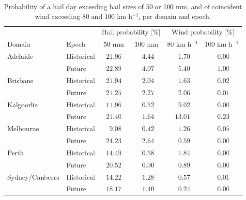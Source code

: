 \documentclass[draft,grl]{agutexSI2019}\usepackage[]{graphicx}\usepackage[]{xcolor}
\begin{document}
\begin{article}
\begin{table}
    \centering
    \caption{Probability of a hail day exceeding hail sizes of 50 or 100 mm, and of coincident wind exceeding 80 and 100 km h$^{-1}$, per domain and epoch.}
    \label{tab:exceedence_probs}
    \begin{tabular}{llcccc}
    \hline
    & & \multicolumn{2}{c}{Hail probability [\%]} & \multicolumn{2}{c}{Wind probability [\%]} \\ 
    Domain & Epoch & 50 mm & 100 mm & 80 km h$^{-1}$ & \multicolumn{1}{c}{100 km h$^{-1}$} \\ 
    \hline
Adelaide & Historical  & $21.96$ & $\phantom{0}4.44$ & $\phantom{0}1.70$ & $\phantom{0}0.00$ \\ & Future  & $22.89$ & $\phantom{0}4.07$ & $\phantom{0}5.40$ & $\phantom{0}1.00$ \\Brisbane & Historical  & $21.94$ & $\phantom{0}2.04$ & $\phantom{0}1.63$ & $\phantom{0}0.02$ \\ & Future  & $21.25$ & $\phantom{0}2.27$ & $\phantom{0}2.06$ & $\phantom{0}0.01$ \\Kalgoorlie & Historical  & $11.96$ & $\phantom{0}0.52$ & $\phantom{0}9.02$ & $\phantom{0}0.00$ \\ & Future  & $21.40$ & $\phantom{0}1.64$ & $13.01$ & $\phantom{0}0.23$ \\Melbourne & Historical  & $\phantom{0}9.08$ & $\phantom{0}0.42$ & $\phantom{0}1.26$ & $\phantom{0}0.05$ \\ & Future  & $24.23$ & $\phantom{0}2.64$ & $\phantom{0}0.59$ & $\phantom{0}0.00$ \\Perth & Historical  & $14.49$ & $\phantom{0}0.58$ & $\phantom{0}1.84$ & $\phantom{0}0.00$ \\ & Future  & $20.52$ & $\phantom{0}0.00$ & $\phantom{0}0.89$ & $\phantom{0}0.00$ \\Sydney/Canberra & Historical  & $14.22$ & $\phantom{0}1.28$ & $\phantom{0}0.57$ & $\phantom{0}0.01$ \\ & Future  & $18.17$ & $\phantom{0}1.40$ & $\phantom{0}0.24$ & $\phantom{0}0.00$ \\
    \hline 
    \end{tabular}
\end{table}


\end{article}
\end{document}
